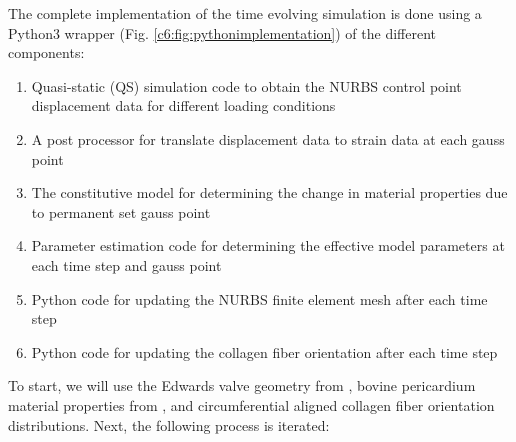     The complete implementation of the time evolving simulation is done using a Python3 wrapper (Fig. \ref{c6:fig:pythonimplementation}) of the different components: 
    \begin{enumerate}[label=\Alph*]
        \item Quasi-static (QS) simulation code to obtain the NURBS control point displacement data for different loading conditions
        \item A post processor for translate displacement data to strain data at each gauss point
        \item The constitutive model for determining the change in material properties due to permanent set gauss point
        \item Parameter estimation code for determining the effective model parameters at each time step and gauss point
        \item Python code for updating the NURBS finite element mesh after each time step
        \item Python code for updating the collagen fiber orientation after each time step
    \end{enumerate}
    To start, we will use the Edwards valve geometry from \cite{aggarwal_inverse_2015}, bovine pericardium material properties from \cite{sacks_novel_2015}, and circumferential aligned collagen fiber orientation distributions. Next, the following process is iterated:
